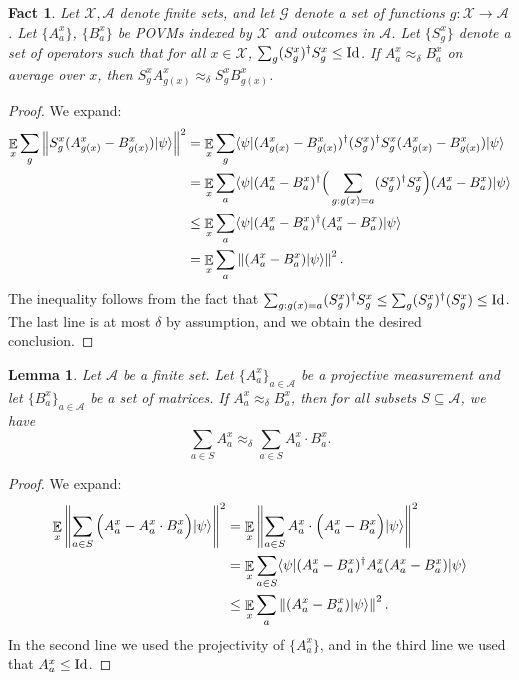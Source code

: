 \documentclass{book}
\theoremstyle{plain}
\newtheorem{lemma}[subsection]{Lemma}
\newtheorem{fact}[subsection]{Fact}
\theoremstyle{definition}
\theoremstyle{remark}
\numberwithin{equation}{subsection}
\newcommand{\E}{\mathop{\mathbb{E}}\displaylimits} %
\newcommand{\Id}{\ensuremath{\mathop{\rm Id}\nolimits}}
\newcommand{\norm}[1]{\left\| {#1} \right\|}
\newcommand{\ket}[1]{|#1\rangle}
\newcommand{\bra}[1]{\langle#1|}
\begin{document}
\begin{fact}
\label{fact:add-a-proj2}
Let $\mathcal{X},\mathcal{A}$ denote finite sets, and let $\mathcal{G}$ denote a set of functions $g: \mathcal{X} \to \mathcal{A}$. Let $\{A^x_a \}$, $\{B^x_a\}$ be POVMs indexed by $\mathcal{X}$ and outcomes in $\mathcal{A}$. Let $\{ S_g^x \}$ denote a set of operators such that for all $x \in \mathcal{X}$, $\sum_g (S_g^x)^\dagger S_g^x \leq \Id$. 
If $A^x_a \approx_\delta B^x_a$ on average over $x$, then $S_g^x A^x_{g(x)} \approx_\delta S_g^x B^x_{g(x)}$. 
\end{fact}
\begin{proof}
	We expand:
	\begin{align*}
		\E_x \sum_g \norm{ S^x_g (A^x_{g(x)} - B^x_{g(x)}) \ket{\psi}}^2 &= \E_x \sum_g \bra{\psi} (A^x_{g(x)} - B^x_{g(x)})^\dagger  (S_g^x)^\dagger S_g^x (A^x_{g(x)} - B^x_{g(x)}) \ket{\psi} \\
		&= \E_x \sum_a \bra{\psi} (A^x_a - B^x_a)^\dagger  \Big(\sum_{g: g(x) = a} (S_g^x)^\dagger S_g^x \Big) (A^x_a - B^x_a) \ket{\psi} \\
		&\leq \E_x \sum_a \bra{\psi} (A^x_a - B^x_a)^\dagger (A^x_a - B^x_a) \ket{\psi} \\
		&= \E_x \sum_a \norm{ (A^x_a - B^x_a) \ket{\psi} }^2.
	\end{align*}
	The inequality follows from the fact that $\sum_{g: g(x) = a} (S_g^x)^\dagger S_g^x \leq \sum_g (S_g^x)^\dagger (S_g^x) \leq \Id$. The last line is at most $\delta$ by assumption, and we obtain the desired conclusion.
\end{proof}


\begin{lemma}
\label{lem:cool-closeness-fact}
Let $\mathcal{A}$ be a finite set. Let $\{A^x_a\}_{a \in \mathcal{A}}$ be a projective measurement and let $\{B^x_a\}_{a \in \mathcal{A}}$ be a set of matrices. If $A^x_a \approx_\delta B^x_a$, then for all subsets $S \subseteq \mathcal{A}$, we have
\[
	\sum_{a \in S} A^x_a \approx_\delta \sum_{a \in S} A^x_a \cdot B^x_a.
\]
\end{lemma}
\begin{proof}
We expand:
\begin{align*}
	\E_x \norm{ \sum_{a \in S} \Big(A^x_a - A^x_a \cdot B^x_a\Big) \ket{\psi}}^2 &= \E_x \norm{ \sum_{a \in S} A^x_a \cdot \Big(A^x_a - B^x_a\Big) \ket{\psi}}^2 \\
	&= \E_x \sum_{a \in S} \bra{\psi} (A^x_a - B^x_a)^\dagger A^x_a (A^x_a - B^x_a) \ket{\psi} \\
	&\leq \E_x \sum_a \norm{ (A^x_a -  B^x_a) \ket{\psi}}^2.
\end{align*}
In the second line we used the projectivity of $\{ A^x_a \}$, and in the third line we used that $A^x_a \leq \Id$.
\end{proof}
\end{document}

